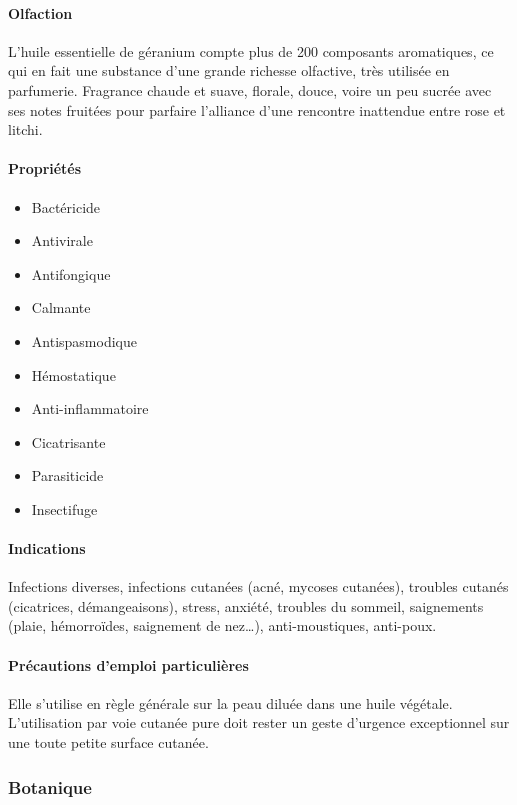 \documentclass[12pt,a4wide]{article}
\begin{document}
\paragraph{Olfaction}
\label{sec-4-7-1-1}
L'huile essentielle de géranium compte plus de 200 composants aromatiques, ce qui en fait une substance d'une grande richesse olfactive, très utilisée en parfumerie.
Fragrance chaude et suave, florale, douce, voire un peu sucrée avec ses notes fruitées pour parfaire l'alliance d'une rencontre inattendue entre rose et litchi.
\paragraph{Propriétés}
\label{sec-4-7-1-2}
\begin{itemize}
\item Bactéricide
\item Antivirale
\item Antifongique
\item Calmante
\item Antispasmodique
\item Hémostatique
\item Anti-inflammatoire
\item Cicatrisante
\item Parasiticide
\item Insectifuge
\end{itemize}

\paragraph{Indications}
\label{sec-4-7-1-3}
Infections diverses, infections cutanées (acné, mycoses cutanées), troubles cutanés (cicatrices, démangeaisons), stress, anxiété, troubles du sommeil, saignements (plaie, hémorroïdes, saignement de nez…), anti-moustiques, anti-poux.

\paragraph{Précautions d'emploi particulières}
\label{sec-4-7-1-4}
Elle s'utilise en règle générale sur la peau diluée dans une huile végétale.
L'utilisation par voie cutanée pure doit rester un geste d'urgence exceptionnel sur une toute petite surface cutanée.



\subsubsection{Botanique}
\label{sec-4-7-2}
\end{document}
